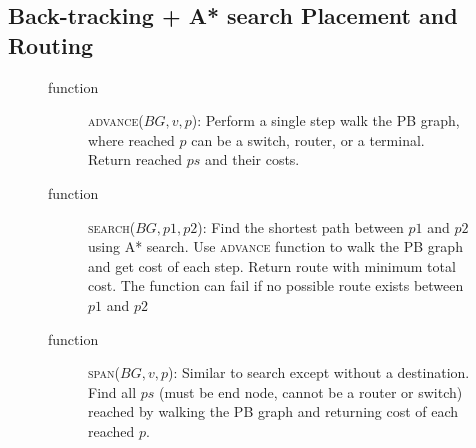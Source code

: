 \subsection{Back-tracking + A* search Placement and Routing}
\begin{figure}[!ht]
  \small
  \begin{description}
    \item [function] \textsc{advance}($BG,v,p$):
      Perform a single step walk the PB graph, where reached $p$ can be a switch, router, or a terminal.
      Return reached $ps$ and their costs.
    \item [function] \textsc{search}($BG,p1,p2$):
      Find the shortest path between $p1$ and $p2$ using A* search. Use \textsc{advance} function to walk
      the PB graph and get cost of each step. Return route with minimum total cost. The function can
      fail if no possible route exists between $p1$ and $p2$
    \item [function] \textsc{span}($BG,v,p$):
      Similar to search except without a destination. Find all $ps$ (must be end node, cannot be a router or switch) reached by 
      walking the PB graph and returning cost of each reached $p$.
  \end{description}


\end{figure}

